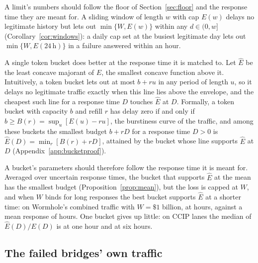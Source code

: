 \documentclass[conference,compsoc]{IEEEtran}
\numberwithin{equation}{section}
\theoremstyle{plain}
\theoremstyle{definition}
\theoremstyle{remark}
\begin{document}
A limit's numbers should follow the floor of Section~\ref{sec:floor} and the response time they are meant for. A sliding window of length $w$ with cap $E(w)$ delays no legitimate history but lets out $\min\{W, E(w)\}$ within any $d \in (0, w]$ (Corollary~\ref{cor:windows}): a daily cap set at the busiest legitimate day lets out $\min\{W, E(24\,\mathrm{h})\}$ in a failure answered within an hour.

A single token bucket does better at the response time it is matched to. Let $\hat{E}$ be the least concave majorant of $E$, the smallest concave function above it. Intuitively, a token bucket lets out at most $b + ru$ in any period of length $u$, so it delays no legitimate traffic exactly when this line lies above the envelope, and the cheapest such line for a response time $D$ touches $\hat{E}$ at $D$. Formally, a token bucket with capacity $b$ and refill $r$ has delay zero if and only if $b \ge B(r) = \sup_u [E(u) - ru]$, the burstiness curve of the traffic, and among these buckets the smallest budget $b + rD$ for a response time $D > 0$ is $\hat{E}(D) = \min_r [B(r) + rD]$, attained by the bucket whose line supports $\hat{E}$ at $D$ (Appendix~\ref{app:bucketproof}).

A bucket's parameters should therefore follow the response time it is meant for. Averaged over uncertain response times, the bucket that supports $\hat{E}$ at the mean has the smallest budget (Proposition~\ref{prop:mean}), but the loss is capped at $W$, and when $W$ binds for long responses the best bucket supports $\hat{E}$ at a shorter time: on Wormhole's combined traffic with $W = \$1$ billion, at \bestOneBDStarH{} hours, against a mean response of \meanRespH{} hours. One bucket gives up little: on CCIP lanes the median of $\hat{E}(D)/E(D)$ is \oneBucketCcipOneMed{} at one hour and \oneBucketCcipSixMed{} at six hours.

\subsection{The failed bridges' own traffic}\label{sec:perbridge}
\end{document}
